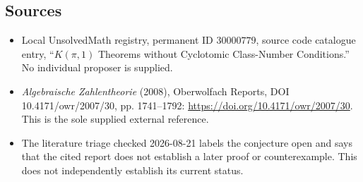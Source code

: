 \documentclass[11pt]{article}
\begin{document}
\subsection{Sources}
\begin{itemize}
\item Local UnsolvedMath registry, permanent ID \(30000779\), source code catalogue entry, ``\(K(\pi,1)\) Theorems without Cyclotomic Class-Number Conditions.'' No individual proposer is supplied.
\item \emph{Algebraische Zahlentheorie} (2008), Oberwolfach Reports, DOI 10.4171/owr/2007/30, pp. 1741--1792: \url{https://doi.org/10.4171/owr/2007/30}. This is the sole supplied external reference.
\item The literature triage checked 2026-08-21 labels the conjecture open and says that the cited report does not establish a later proof or counterexample. This does not independently establish its current status.
\end{itemize}
\end{document}
